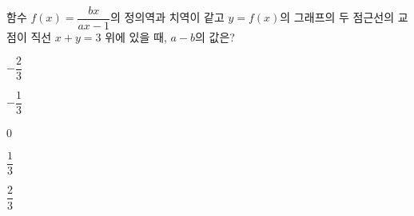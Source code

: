 \hspace*{2mm}\begin{minipage}[t]{\dimexpr\linewidth-2mm\relax}\vspace{0pt}
함수 $f(x)=\dfrac{bx}{ax-1}$의 정의역과 치역이 같고 $y=f(x)$의 그래프의 두 점근선의 교점이 직선 $x+y=3$ 위에 있을 때, $a-b$의 값은? 
\begin{choices32}{\rule[-3ex]{0pt}{8ex}$-\dfrac{2}{3}$}{\rule[-3ex]{0pt}{8ex}$-\dfrac{1}{3}$}{\rule[-3ex]{0pt}{8ex}$0$}{\rule[-3ex]{0pt}{8ex}$\dfrac{1}{3}$}{\rule[-3ex]{0pt}{8ex}$\dfrac{2}{3}$}\end{choices32}\end{minipage}
